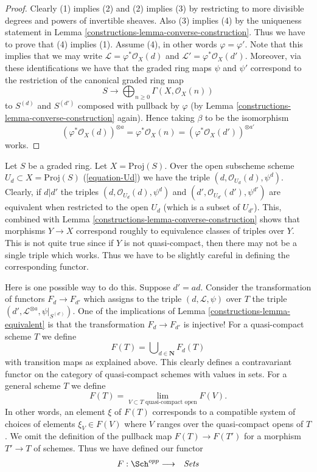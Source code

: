 \begin{proof}

Clearly (1) implies (2) and (2) implies (3) by restricting to
more divisible degrees and powers of invertible sheaves.
Also (3) implies (4) by the uniqueness statement
in Lemma \ref{constructions-lemma-converse-construction}.
Thus we have to prove that (4) implies (1). Assume (4),
in other words $\varphi = \varphi'$.
Note that this implies that we may write
$\mathcal{L} = \varphi^*\mathcal{O}_X(d)$ and
$\mathcal{L}' = \varphi^*\mathcal{O}_X(d')$.
Moreover, via these identifications we have that the graded ring
maps $\psi$ and $\psi'$ correspond to the restriction of the canonical
graded ring map
$$
S \longrightarrow \bigoplus\nolimits_{n \geq 0} \Gamma(X, \mathcal{O}_X(n))
$$
to $S^{(d)}$ and $S^{(d')}$ composed with pullback by $\varphi$
(by Lemma \ref{constructions-lemma-converse-construction} again). Hence taking
$\beta$ to be the isomorphism
$$
(\varphi^*\mathcal{O}_X(d))^{\otimes a} =
\varphi^*\mathcal{O}_X(n) =
(\varphi^*\mathcal{O}_X(d'))^{\otimes a'}
$$
works.
\end{proof}

Let $S$ be a graded ring.
Let $X = \text{Proj}(S)$.
Over the open subscheme scheme $U_d \subset X = \text{Proj}(S)$
(\ref{equation-Ud}) we have the triple
$(d, \mathcal{O}_{U_d}(d), \psi^d)$. Clearly, if $d | d'$ the triples
$(d, \mathcal{O}_{U_d}(d), \psi^d)$ and
$(d', \mathcal{O}_{U_{d'}}(d'), \psi^{d'})$ are equivalent
when restricted to the open $U_d$ (which is a subset of $U_{d'}$).
This, combined with Lemma \ref{constructions-lemma-converse-construction} shows
that morphisms $Y \to X$ correspond roughly to
equivalence classes of triples over $Y$. This is not quite true since if $Y$ is
not quasi-compact, then there may not be a single triple which works.
Thus we have to be slightly careful in defining the corresponding functor.

\medskip\noindent
Here is one possible way to do this. Suppose $d' = ad$.
Consider the transformation of functors $F_d \to F_{d'}$
which assigns to the triple $(d, \mathcal{L}, \psi)$ over
$T$ the triple $(d', \mathcal{L}^{\otimes a}, \psi|_{S^{(d')}})$.
One of the implications of Lemma \ref{constructions-lemma-equivalent} is that the
transformation $F_d \to F_{d'}$ is injective!
For a quasi-compact scheme $T$ we define
$$
F(T) = \bigcup\nolimits_{d \in \mathbf{N}} F_d(T)
$$
with transition maps as explained above. This clearly defines a
contravariant functor on the category of quasi-compact schemes
with values in sets. For a general scheme
$T$ we define
$$
F(T)
=
\lim_{V \subset T\text{ quasi-compact open}} F(V).
$$
In other words, an element $\xi$ of $F(T)$ corresponds to a compatible system
of choices of elements $\xi_V \in F(V)$ where $V$ ranges over the
quasi-compact opens of $T$.
We omit the definition of the pullback map $F(T) \to F(T')$
for a morphism $T' \to T$ of schemes.
Thus we have defined our functor
\begin{eqnarray*}
F : \Sch^{opp} & \longrightarrow & \textit{Sets}
\end{eqnarray*}

